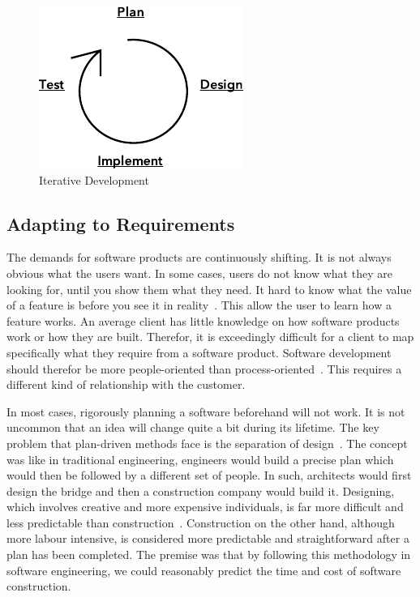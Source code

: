 \documentclass[english]{tktltiki2}
\begin{document}
\begin{figure}[h!]

    \vspace{1cm}
    \centering

    \includegraphics{figures/iterative-development}

    \caption{Iterative Development}
    \label{figure:iterative-development}

\end{figure}

\subsection{Adapting to Requirements}

The demands for software products are continuously shifting. It is not always obvious what the users want. In some cases, users do not know what they are looking for, until you show them what they need. It hard to know what the value of a feature is before you see it in reality~\cite{Fow05}. This allow the user to learn how a feature works. An average client has little knowledge on how software products work or how they are built. Therefor, it is exceedingly difficult for a client to map specifically what they require from a software product. Software development should therefor be more people-oriented than process-oriented~\cite{Fow05}. This requires a different kind of relationship with the customer.

In most cases, rigorously planning a software beforehand will not work. It is not uncommon that an idea will change quite a bit during its lifetime. The key problem that plan-driven  methods face is the separation of design~\cite{Fow05}. The concept was like in traditional engineering, engineers would build a precise plan which would then be followed by a different set of people. In such, architects would first design the bridge and then a construction company would build it. Designing, which involves creative and more expensive individuals, is far more difficult and less predictable than construction~\cite{Fow05}. Construction on the other hand, although more labour intensive, is considered more predictable and straightforward after a plan has been completed. The premise was that by following this methodology in software engineering, we could reasonably predict the time and cost of software construction.
\end{document}
